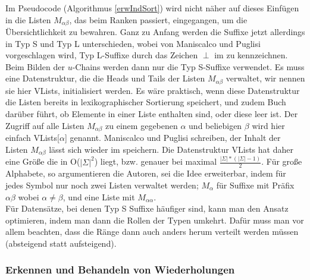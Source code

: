 Im Pseudocode (Algorithmus \ref{erwIndSort}) wird nicht näher auf dieses Einfügen in die Listen $M_{\alpha\beta}$, das beim Ranken passiert, eingegangen, um die Übersichtlichkeit zu bewahren. Ganz zu Anfang werden die Suffixe jetzt allerdings in Typ S und Typ L unterschieden, wobei von Maniscalco und Puglisi vorgeschlagen wird, Typ L-Suffixe durch das Zeichen $\perp$ im \isa zu kennzeichnen. Beim Bilden der $u$-Chains werden dann nur die Typ S-Suffixe verwendet. Es muss eine Datenstruktur, die die Heads und Tails der Listen $M_{\alpha\beta}$ verwaltet, wir nennen sie hier VLists, initialisiert werden. Es wäre praktisch, wenn diese Datenstruktur die Listen bereits in lexikographischer Sortierung speichert, und zudem Buch darüber führt, ob Elemente in einer Liste enthalten sind, oder diese leer ist. Der Zugriff auf alle Listen $M_{\alpha\beta}$ zu einem gegebenen $\alpha$ und beliebigen $\beta$ wird hier einfach VLists[$\alpha$] genannt.
Maniscalco und Puglisi schreiben, der Inhalt der Listen $M_{\alpha\beta}$ lässt sich wieder im \isa speichern. Die Datenstruktur VLists hat daher eine Größe die in O($|\Sigma|^2$) liegt, bzw. genauer bei maximal $\frac{|\Sigma|*(|\Sigma|-1)}{2}$.
Für große Alphabete, so argumentieren die Autoren, sei die Idee erweiterbar, indem für jedes Symbol nur noch zwei Listen verwaltet werden; $M_\alpha$ für Suffixe mit Präfix $\alpha\beta$ wobei $\alpha \neq \beta$, und eine Liste mit $M_{\alpha\alpha}$.\\
Für Datensätze, bei denen Typ S Suffixe häufiger sind, kann man den Ansatz optimieren, indem man dann die Rollen der Typen umkehrt. Dafür muss man vor allem beachten, dass die Ränge dann auch anders herum verteilt werden müssen (absteigend statt aufsteigend).

\subsubsection{Erkennen und Behandeln von Wiederholungen}

